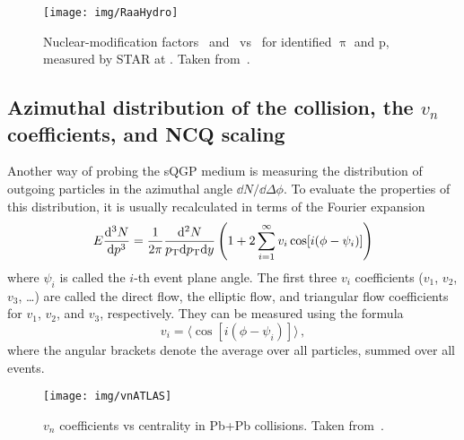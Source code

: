 \begin{figure}[!htb]
\centering
\texttt{[image: img/RaaHydro]}
\caption[Nuclear-modification factors \Raa\ and \Rcp\ vs \pt\ for identified $\uppi$ and p, measured by STAR at \snnFull.]{\label{RaaHydro}Nuclear-modification factors \Raa\ and \Rcp\ vs \pt\ for identified $\uppi$ and p, measured by STAR at \snnFull\@. Taken from~\cite{RaaPiP}\@.}

\end{figure}

\subsection{Azimuthal distribution of the collision, the $v_n$ coefficients, and NCQ scaling}
Another way of probing the sQGP medium is measuring the distribution of outgoing particles in the azimuthal angle $\dd N/ \dd \Delta \phi$\@. To evaluate the properties of this distribution, it is usually recalculated in terms of the Fourier expansion
\begin{equation}
E\frac{\mathrm{d}^3 N}{ \mathrm{d} p^3} = \frac{1}{2\pi}\frac{\mathrm{d}^2 N}{{p_{\mathrm{T}}} \mathrm{d} {p_{\mathrm{T}}} \mathrm{d} y} \left(1 + 2\sum_{i=1}^\infty v_i \cos[i(\phi - \psi_i)] \right)
\end{equation}
where $\psi_i$ is called the $i$-th event plane angle. The first three $v_i$ coefficients ($v_1$, $v_2$, $v_3$, \dots) are called the direct flow, the elliptic flow, and triangular flow coefficients for $v_1$, $v_2$, and $v_3$, respectively. They can be measured using the formula
\begin{equation}
v_i = \langle \cos[i(\phi - \psi_i)] \rangle\,,
\end{equation}
where the angular brackets denote the average over all particles, summed over all events.

\begin{figure}[!htb]
\centering
\texttt{[image: img/vnATLAS]}
\caption[$v_n$ coefficients vs centrality in Pb+Pb collisions.]{\label{vnATLAS}$v_n$ coefficients vs centrality in Pb+Pb collisions. Taken from~\cite{vnATLAS}\@.}

\end{figure}


